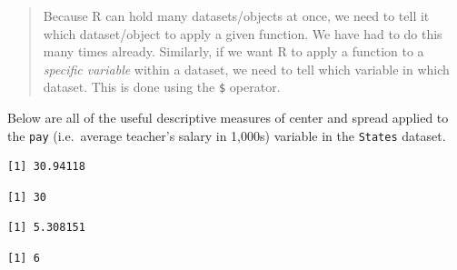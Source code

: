 \documentclass[
]{book}
\makeatletter
\newenvironment{Shaded}{\begin{snugshade}}{\end{snugshade}}
\newcommand{\FunctionTok}[1]{\textcolor[rgb]{0,0,0}{#1}}
\newcommand{\NormalTok}[1]{#1}
\newcommand{\SpecialCharTok}[1]{\textcolor[rgb]{0,0,0}{#1}}
\newenvironment{kframe}{%
\medskip{}
\setlength{\fboxsep}{.8em}
 \def\at@end@of@kframe{}%
 \ifinner\ifhmode%
  \def\at@end@of@kframe{\end{minipage}}%
  \begin{minipage}{\columnwidth}%
 \fi\fi%
 \def\FrameCommand##1{\hskip\@totalleftmargin \hskip-\fboxsep
 \colorbox{shadecolor}{##1}\hskip-\fboxsep
     \hskip-\linewidth \hskip-\@totalleftmargin \hskip\columnwidth}%
 \MakeFramed {\advance\hsize-\width
   \@totalleftmargin\z@ \linewidth\hsize
   \@setminipage}}%
 {\par\unskip\endMakeFramed%
 \at@end@of@kframe}
\renewenvironment{Shaded}{\begin{kframe}}{\end{kframe}}
\makeatother
\begin{document}
\begin{quote}
Because R can hold many datasets/objects at once, we need to tell it which dataset/object to apply a given function. We have had to do this many times already. Similarly, if we want R to apply a function to a \emph{specific variable} within a dataset, we need to tell which variable in which dataset. This is done using the \texttt{\$} operator.
\end{quote}

Below are all of the useful descriptive measures of center and spread applied to the \texttt{pay} (i.e.~average teacher's salary in 1,000s) variable in the \texttt{States} dataset.

\begin{Shaded}
\end{Shaded}

\begin{verbatim}
[1] 30.94118
\end{verbatim}

\begin{Shaded}
\end{Shaded}

\begin{verbatim}
[1] 30
\end{verbatim}

\begin{Shaded}
\end{Shaded}

\begin{verbatim}
[1] 5.308151
\end{verbatim}

\begin{Shaded}
\end{Shaded}

\begin{verbatim}
[1] 6
\end{verbatim}
\end{document}
